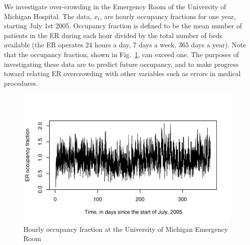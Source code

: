 \documentclass[12pt]{article}
\def\bc{\begin{center}}
\def\ec{\end{center}}
\begin{document}
We investigate over-crowding in the Emergency Room of the University of Michigan Hospital.
The data, $x_t$, are hourly occupancy fractions for one year, starting July 1st 2005. Occupancy fraction is defined to be the mean number of patients in the ER during each hour  divided by the total number of beds available (the ER operates 24 hours a day, 7 days a week, 365 days a year).
Note that the occupancy fraction, shown in Fig.~\ref{fig:er}, can exceed one.
The purposes of investigating these data are to predict future occupancy, and to make progress toward relating ER overcrowding with other variables such as errors in medical procedures.
\begin{figure}[h]
\bc
\vspace{-1cm}
\includegraphics[width=5in]{ER-um-05}
\vspace{-1cm}
\ec
\caption{Hourly occupancy fraction at the University of Michigan Emergency Room}\label{fig:er}
\end{figure}
\end{document}
